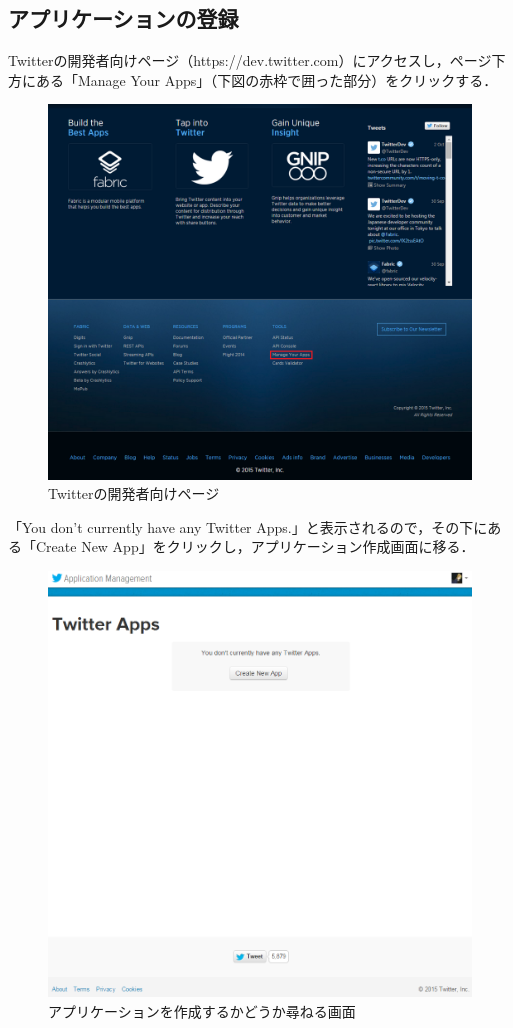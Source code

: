 \subsection{アプリケーションの登録}
Twitterの開発者向けページ（https://dev.twitter.com）にアクセスし，ページ下方にある「Manage Your Apps」（下図の赤枠で囲った部分）をクリックする．

\begin{figure}[H]
\centering
\includegraphics[width=13cm]{dev_twitter.PNG}
\caption{Twitterの開発者向けページ}\label{devTwitter}
\end{figure}
	
「You don't currently have any Twitter Apps.」と表示されるので，その下にある「Create New App」をクリックし，アプリケーション作成画面に移る．

\begin{figure}[H]
\centering
\includegraphics[width=13cm]{You_dont_currently_have_any_Twitter_Apps.PNG}
\caption{アプリケーションを作成するかどうか尋ねる画面}\label{donthaveapp}
\end{figure}


